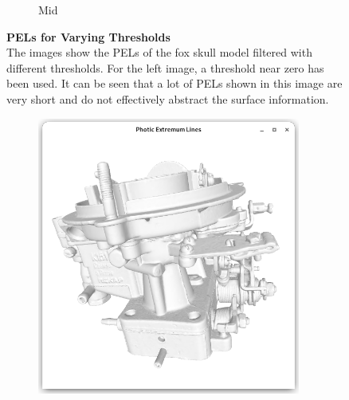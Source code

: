 \documentclass[9pt,fleqn,twoside,twocolumn]{stdglobal}
\begin{document}
\begin{figure}[t]
\begin{subfigure}[b]{0.49\linewidth}
        \caption{Mid}
      \end{subfigure}
      \caption{%
        \textbf{PELs for Varying Thresholds}\\
        The images show the PELs of the fox skull model filtered with different thresholds.
        For the left image, a threshold near zero has been used.
        It can be seen that a lot of PELs shown in this image are very short and do not effectively abstract the surface information.
      }
      \label{fig:threshold-effect}
    \end{figure}

    \begin{figure}
      \centering
      \begin{subfigure}[t]{0.19\textwidth}
        \centering
        \includegraphics[width=0.95\textwidth,trim={15px 15 15 50},clip]{images/results/carburetor.png}

\end{subfigure}
\end{figure}
\end{document}
